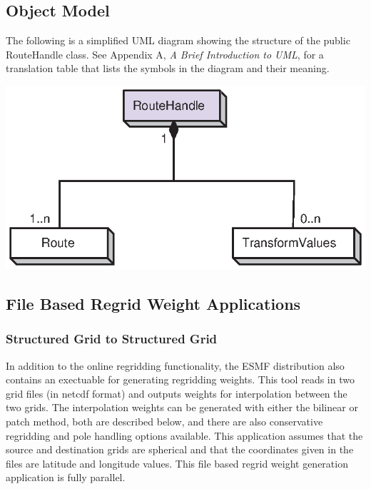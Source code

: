 \subsection{Object Model}

The following is a simplified UML diagram showing the structure of the public
RouteHandle class.  See Appendix A, {\it A Brief Introduction to UML}, for a
translation table that lists the symbols in the diagram and their meaning.

\begin{center}
\includegraphics{RouteHandle_obj}
\end{center}


\subsection{File Based Regrid Weight Applications}
\label{sec:regrid:offline}

\subsubsection{Structured Grid to Structured Grid}

 In addition to the online regridding functionality, the ESMF distribution also 
contains an exectuable for generating regridding weights. This tool reads in
two grid files (in netcdf format) and outputs weights for interpolation
between the two grids.  The interpolation weights can be generated with either the bilinear
or patch method, both are described below, and there are also conservative regridding 
and pole handling options available.
This application assumes that the source and destination grids
are spherical and that the coordinates given in the files are latitude and longitude
values. This file based regrid weight generation application is fully parallel.

